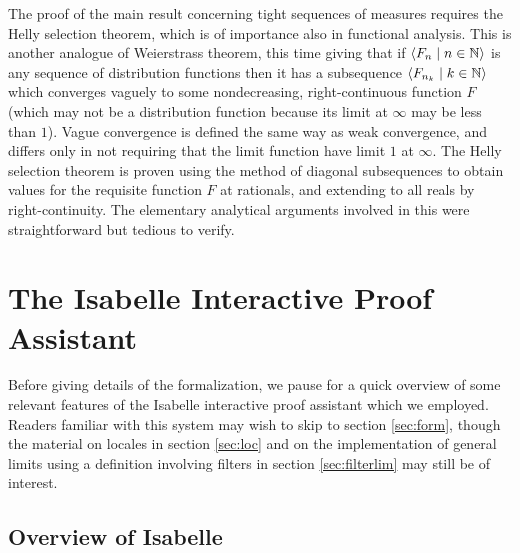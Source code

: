 \documentclass{article}
\theoremstyle{definition}
\newcommand{\bldseq}[2]{\langle{#1}\mid{#2}\rangle}
\begin{document}
The proof of the main result concerning tight sequences of measures requires the Helly selection theorem, which is of importance also in functional analysis. This is another analogue of Weierstrass theorem, this time giving that if $\bldseq{F_n}{n \in \N}$ is any sequence of distribution functions then it has a subsequence $\bldseq{F_{n_k}}{k \in \N}$ which converges vaguely to some nondecreasing, right-continuous function $F$ (which may not be a distribution function because its limit at $\infty$ may be less than $1$). Vague convergence is defined the same way as weak convergence, and differs only in not requiring that the limit function have limit $1$ at $\infty$. The Helly selection theorem is proven using the method of diagonal subsequences to obtain values for the requisite function $F$ at rationals, and extending to all reals by right-continuity. The elementary analytical arguments involved in this were straightforward but tedious to verify.

\section{The Isabelle Interactive Proof Assistant}

Before giving details of the formalization, we pause for a quick overview of some relevant features of the Isabelle interactive proof assistant which we employed. Readers familiar with this system may wish to skip to section \ref{sec:form}, though the material on locales in section \ref{sec:loc} and on the implementation of general limits using a definition involving filters in section \ref{sec:filterlim} may still be of interest.

\subsection{Overview of Isabelle}
\end{document}
